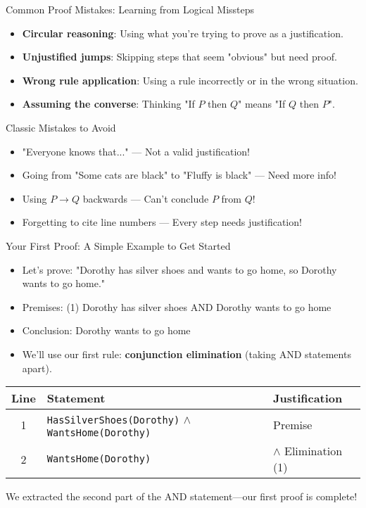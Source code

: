 \documentclass{beamer}
\begin{document}
	\begin{frame}{Common Proof Mistakes: Learning from Logical Missteps}
		\begin{itemize}
			\item \textbf{Circular reasoning}: Using what you're trying to prove as a justification.
			\item \textbf{Unjustified jumps}: Skipping steps that seem "obvious" but need proof.
			\item \textbf{Wrong rule application}: Using a rule incorrectly or in the wrong situation.
			\item \textbf{Assuming the converse}: Thinking "If $P$ then $Q$" means "If $Q$ then $P$".
		\end{itemize}
		
		\begin{alertblock}{Classic Mistakes to Avoid}
			\begin{itemize}
				\item "Everyone knows that..." — Not a valid justification!
				\item Going from "Some cats are black" to "Fluffy is black" — Need more info!
				\item Using $P \rightarrow Q$ backwards — Can't conclude $P$ from $Q$!
				\item Forgetting to cite line numbers — Every step needs justification!
			\end{itemize}
		\end{alertblock}
	\end{frame}
	
	\begin{frame}{Your First Proof: A Simple Example to Get Started}
		\begin{itemize}
			\item Let's prove: "Dorothy has silver shoes and wants to go home, so Dorothy wants to go home."
			\item Premises: (1) Dorothy has silver shoes AND Dorothy wants to go home
			\item Conclusion: Dorothy wants to go home
			\item We'll use our first rule: \textbf{conjunction elimination} (taking AND statements apart).
		\end{itemize}
		
		\begin{example}
			\scriptsize{
			\begin{tabular}{|c|l|l|}
				\hline
				\textbf{Line} & \textbf{Statement} & \textbf{Justification} \\
				\hline
				1 & \texttt{HasSilverShoes(Dorothy)} $\land$ \texttt{WantsHome(Dorothy)} & Premise \\
				2 & \texttt{WantsHome(Dorothy)} & $\land$ Elimination (1) \\
				\hline
			\end{tabular}
			
			We extracted the second part of the AND statement—our first proof is complete!
		}
		\end{example}
	\end{frame}
	
\end{document}
